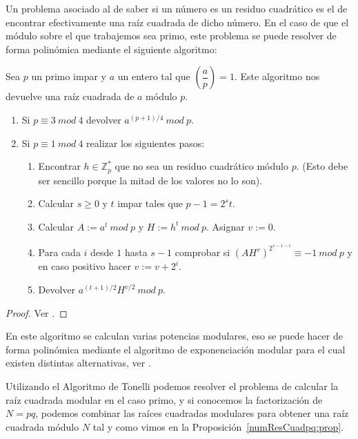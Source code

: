 Un problema asociado al de saber si un n\'umero es un residuo cuadr\'atico es el de encontrar efectivamente una ra\'iz cuadrada de dicho n\'umero.
En el caso de que el m\'odulo sobre el que trabajemos sea primo, este problema se puede resolver de forma polin\'omica mediante el siguiente algoritmo:

\begin{algorithm}[Tonelli]
\label{algoTonelli}
Sea $p$ un primo impar y $a$ un entero tal que $\left( \dfrac{a}{p} \right) = 1$.
Este algoritmo nos devuelve una ra\'iz cuadrada de $a$ m\'odulo $p$.
\begin{enumerate}
\item Si $p \equiv 3 ~mod~4$ devolver $a^{(p+1)/4}~mod~p$.
\item Si $p \equiv 1 ~mod~4$ realizar los siguientes pasos:
\begin{enumerate}
\item Encontrar $h \in {\mathbb Z}_p^*$ que no sea un residuo cuadr\'atico m\'odulo $p$. (Esto debe ser sencillo porque la mitad de los valores no lo son).
\item Calcular $s \geq 0$ y $t$ impar tales que $p-1 = 2^s t$.
\item Calcular $A := a^t ~mod~p$ y $H:=h^t~mod~p$. Asignar $v:=0$.
\item Para cada $i$ desde $1$ hasta $s-1$ comprobar si $(AH^v)^{2^{s-1-i}} \equiv -1 ~mod~p$ y en caso positivo hacer $v := v + 2^i$.
\item Devolver $a^{(t+1)/2} H^{v/2} ~mod~p$.
\end{enumerate}
\end{enumerate}
\end{algorithm}
\begin{proof}
Ver \cite[Proposition 2.16]{Pardo}.
\end{proof}

En este algoritmo se calculan varias potencias modulares, eso se puede hacer de forma
polin\'omica mediante el algoritmo de exponenciaci\'on modular para el cual existen
distintas alternativas, ver \cite[Section 2.7.2]{Pardo}.

Utilizando el Algoritmo de Tonelli podemos resolver el problema de calcular
la ra\'iz cuadrada modular en el caso primo, y si conocemos la factorizaci\'on
de $N = pq$, podemos combinar las ra\'ices cuadradas modulares para obtener una
ra\'iz cuadrada m\'odulo $N$ tal y como vimos en la
Proposici\'on~\ref{numResCuadpq:prop}.

